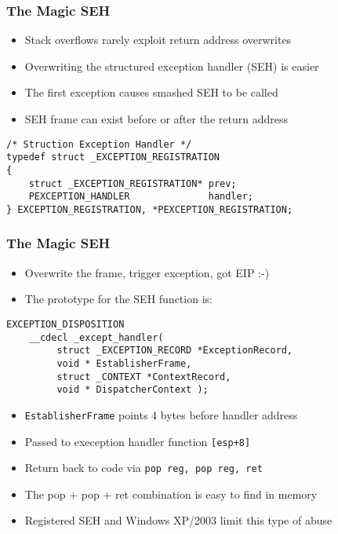 \documentclass{beamer}
\newenvironment{sitemize}{\vspace{1mm}\begin{itemize}\itemsep 4pt\small}{\end{itemize}}
\begin{document}
\begin{frame}[fragile]
	\frametitle{The Magic SEH}
	\begin{sitemize}
		\item Stack overflows rarely exploit return address overwrites
		\item Overwriting the structured exception handler (SEH) is easier
		\item The first exception causes smashed SEH to be called
		\item SEH frame can exist before or after the return address
	\end{sitemize}
{\footnotesize 
	\begin{verbatim}
/* Struction Exception Handler */
typedef struct _EXCEPTION_REGISTRATION
{
	struct _EXCEPTION_REGISTRATION* prev;
	PEXCEPTION_HANDLER              handler;
} EXCEPTION_REGISTRATION, *PEXCEPTION_REGISTRATION;
	\end{verbatim}
}
\end{frame}


\begin{frame}[fragile]
	\frametitle{The Magic SEH}
	\begin{sitemize}
		\item Overwrite the frame, trigger exception, got EIP :-)
		\item The prototype for the SEH function is:
	\end{sitemize}
{\footnotesize 	
	\begin{verbatim}
EXCEPTION_DISPOSITION
	__cdecl _except_handler(
		 struct _EXCEPTION_RECORD *ExceptionRecord,
		 void * EstablisherFrame,
		 struct _CONTEXT *ContextRecord,
		 void * DispatcherContext );
	\end{verbatim}
}
	\pause
	\begin{sitemize}
		\item \texttt{EstablisherFrame} points 4 bytes before handler address
		\pause
		\item Passed to exeception handler function \texttt{[esp+8]}
		\pause
		\item Return back to code via \texttt{pop reg, pop reg, ret}
		\pause
		\item The pop + pop + ret combination is easy to find in memory
		\pause
		\item Registered SEH and Windows XP/2003 limit this type of abuse
	\end{sitemize}
\end{frame}
\end{document}
